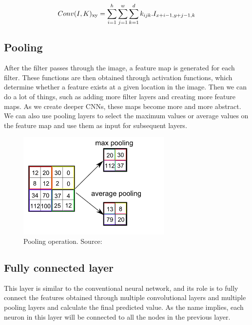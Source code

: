 \begin{equation*}
Conv(I,K)\textsubscript{xy}=\sum_{i=1}^{h}\sum_{j=1}^{w}\sum_{k=1}^{d}k_{ijk}.I_{x+i-1,y+j-1,k}
\end{equation*}
\subsection*{Pooling}
After the filter passes through the image, a feature map is generated for each filter. These functions are then obtained through activation functions, which determine whether a feature exists at a given location in the image. Then we can do a lot of things, such as adding more filter layers and creating more feature maps. As we create deeper CNNs, these maps become more and more abstract. We can also use pooling layers to select the maximum values or average values on the feature map and use them as input for subsequent layers.
\newline	
\begin{figure}[H]
\centering
\includegraphics[width=3in,scale=.75]{images/maxpooling.png}
\caption[Pooling operation]{Pooling operation. Source: \citep{cnn}}
\label{fig:pooling}
\end{figure}

\subsection*{Fully connected layer}
This layer is similar to the conventional neural network, and its role is to fully connect the features obtained through multiple convolutional layers and multiple pooling layers and calculate the final predicted value. As the name implies, each neuron in this layer will be connected to all the nodes in the previous layer.
